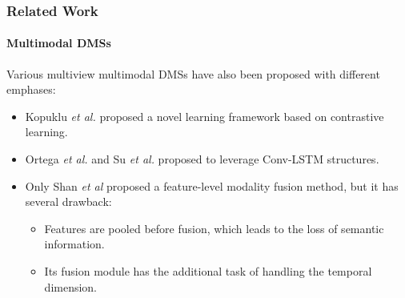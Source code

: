 \begin{frame}
\frametitle{Related Work}
\framesubtitle{Multimodal DMSs}

Various multiview multimodal DMSs have also been proposed with different emphases:
\begin{itemize}
    \item Kopuklu \textit{et al.} \cite{kopuklu2021driver} proposed a novel learning framework based on contrastive learning.
    \item Ortega \textit{et al.} \cite{ortega2020dmd} and Su \textit{et al.} \cite{su2022efficient} proposed to leverage Conv-LSTM structures.
    \item Only Shan \textit{et al} \cite{shan2022multi} proposed a feature-level modality fusion method, but it has several drawback:
    \begin{itemize}
        \item Features are pooled before fusion, which leads to the loss of semantic information.
        \item Its fusion module has the additional task of handling the temporal dimension.
    \end{itemize}
\end{itemize}

\end{frame}
